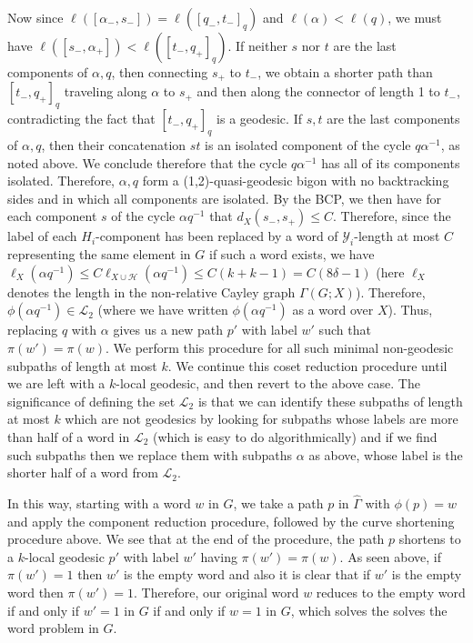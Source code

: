 \documentclass[12pt]{article}
\newcommand{\vs}{\vskip10pt}
\begin{document}
\vs

Now since $\ell([\alpha_-, s_-]) = \ell([q_-, t_-]_q)$ and $\ell(\alpha) < \ell(q)$, we must have $\ell([s_-, \alpha_+]) < \ell([t_-, q_+]_q)$. If neither $s$ nor $t$ are the last components of $\alpha, q$, then connecting $s_+$ to $t_-$, we obtain a shorter path than $[t_-, q_+]_q$ traveling along $\alpha$ to $s_+$ and then along the connector of length 1 to $t_-$, contradicting the fact that $[t_-, q_+]_q$ is a geodesic. If $s,t$ are the last components of $\alpha, q$, then their concatenation $st$ is an isolated component of the cycle $q \alpha^{-1}$, as noted above. We conclude therefore that the cycle $q \alpha^{-1}$ has all of its components isolated. Therefore, $\alpha, q$ form a (1,2)-quasi-geodesic bigon with no backtracking sides and in which all components are isolated. By the BCP, we then have for each component $s$ of the cycle $\alpha q^{-1}$ that $d_X(s_-, s_+) \leq C$. Therefore, since the label of each $H_i$-component has been replaced by a word of $\mathcal{Y}_i$-length at most $C$ representing the same element in $G$ if such a word exists, we have $\ell_X(\alpha q^{-1}) \leq C \ell_{X \cup \mathcal{H}}(\alpha q^{-1}) \leq C(k + k - 1) = C(8 \delta - 1)$ (here $\ell_X$ denotes the length in the non-relative Cayley graph $\Gamma(G;X)$). Therefore, $\phi(\alpha q^{-1}) \in \mathcal{L}_2$ (where we have written $\phi(\alpha q^{-1})$ as a word over $X$). Thus, replacing $q$ with $\alpha$ gives us a new path $p'$ with label $w'$ such that $\pi(w') = \pi(w)$. We perform this procedure for all such minimal non-geodesic subpaths of length at most $k$. We continue this coset reduction procedure until we are left with a $k$-local geodesic, and then revert to the above case. The significance of defining the set $\mathcal{L}_2$ is that we can identify these subpaths of length at most $k$ which are not geodesics by looking for subpaths whose labels are more than half of a word in $\mathcal{L}_2$ (which is easy to do algorithmically) and if we find such subpaths then we replace them with subpaths $\alpha$ as above, whose label is the shorter half of a word from $\mathcal{L}_2$. 
	
	\vs 
	
	In this way, starting with a word $w$ in $G$, we take a path $p$ in $\hat{\Gamma}$ with $\phi(p) = w$ and apply the component reduction procedure, followed by the curve shortening procedure above. We see that at the end of the procedure, the path $p$ shortens to a $k$-local geodesic $p'$ with label $w'$ having $\pi(w') = \pi(w)$. As seen above, if $\pi(w') = 1$ then $w'$ is the empty word and also it is clear that if $w'$ is the empty word then $\pi(w') = 1$. Therefore, our original word $w$ reduces to the empty word if and only if $w' = 1$ in $G$ if and only if $w = 1$ in $G$, which solves the solves the word problem in $G$. 
	
\end{document}
